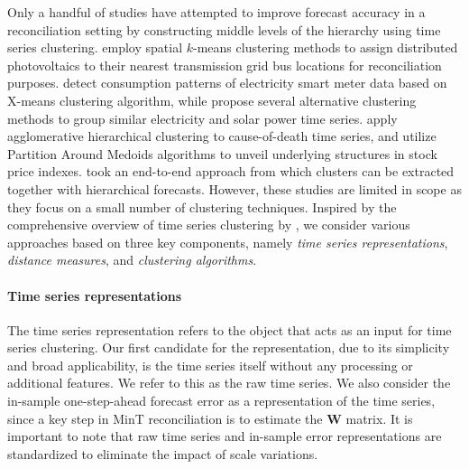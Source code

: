 \documentclass[a4paper,review,12pt,authoryear]{elsarticle}
\begin{document}
{Only a handful of studies have attempted to improve forecast accuracy in a reconciliation setting by constructing middle levels of the hierarchy using time series clustering. \cite{yang2017reconciling} employ spatial $k$-means clustering methods to assign distributed photovoltaics  to their nearest transmission grid bus locations for reconciliation purposes.} \cite{pangHierarchicalElectricityTime2018} detect consumption patterns of electricity smart meter data based on X-means clustering algorithm, while \cite{pangHierarchicalElectricityTime2022} propose several alternative clustering methods to group similar electricity and solar power time series. 
\cite{liForecastReconciliationApproach2019} apply agglomerative hierarchical clustering to cause-of-death time series, and
\cite{matteraImprovingOutofSampleForecasts2023} utilize Partition Around Medoids algorithms to unveil underlying structures in stock price indexes. { \cite{cini2023graph} took an end-to-end approach from which clusters can be extracted together with hierarchical forecasts.} 
However, these studies are limited in scope as they focus on a small number of  clustering techniques. 
Inspired by the comprehensive overview of time series clustering by \cite{aghabozorgiTimeseriesClusteringDecade2015a}, we consider various approaches based on three key components, namely \textit{time series representations}, \textit{distance measures}, and \textit{clustering algorithms}. 






\paragraph{\textbf{Time series representations}}


The time series representation refers to the object that acts as an input for time series clustering. 
{ Our first candidate for the representation, due to its simplicity and broad applicability, is the time series itself without any processing or additional features. We refer to this as the raw time series.}
We also consider the in-sample one-step-ahead forecast error as a representation of the time series, since a key step in MinT reconciliation is to estimate the $\boldsymbol{W}$ matrix. 
It is important to note that raw time series and in-sample error representations are standardized to eliminate the impact of scale variations. 
\end{document}
